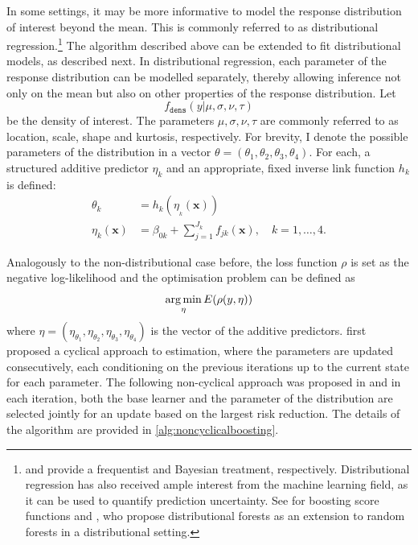 In some settings, it may be more informative to model the response distribution of interest beyond the mean. This is commonly referred to as distributional regression.\footnote{\textcite{rigbyGeneralizedAdditiveModels2005} and \textcite{kleinBayesianStructuredAdditive2015} provide a frequentist and Bayesian treatment, respectively. Distributional regression has also received ample interest from the machine learning field, as it can be used to quantify prediction uncertainty. See \textcite{duanNGBoostNaturalGradient2020} for boosting score functions and \textcite{schlosserDistributionalRegressionForests2019}, who propose distributional forests as an extension to random forests in a distributional setting.} The algorithm described above can be extended to fit distributional models, as described next. In distributional regression, each parameter of the response distribution can be modelled separately, thereby allowing inference not only on the mean but also on other properties of the response distribution. Let 
\begin{equation*}
	f_{\mathtt{dens}}(y \vert \mu, \sigma, \nu, \tau)
\end{equation*}
be the density of interest. The parameters $\mu, \sigma, \nu, \tau$ are commonly referred to as location, scale, shape and kurtosis, respectively. For brevity, I denote the possible parameters of the distribution in a vector $\theta = (\theta_1, \theta_2, \theta_3, \theta_4)$. For each, a structured additive predictor $\eta_k$ and an appropriate, fixed inverse link function $h_k$ is defined: 
\begin{align*}
	\theta_k &= h_k(\eta_{_k} (\mathbf{x}) ) \\
	\eta_k (\mathbf{x}) & =  \beta_{0k} + \sum_{j = 1}^{J_k} f_{jk} (\mathbf{x}), \quad k = 1, \dots, 4.
\end{align*} 

Analogously to the non-distributional case before, the loss function $\rho$ is set as the negative log-likelihood and the optimisation problem can be defined as 
\begin{equation*}
	\operatorname*{arg\,min}_{\eta} E(\rho(y, \eta))
\end{equation*}
where $\eta = (\eta_{\theta_1}, \eta_{\theta_2}, \eta_{\theta_3}, \eta_{\theta_4})$ is the vector of the additive predictors. \textcite{mayrGeneralizedAdditiveModels2012} first proposed a cyclical approach to estimation, where the parameters are updated consecutively, each conditioning on the previous iterations up to the current state for each parameter. The following non-cyclical approach was proposed in \textcite{thomasGradientBoostingDistributional2018} and in each iteration, both the base learner and the parameter of the distribution are selected jointly for an update based on the largest risk reduction. The details of the algorithm are provided in \autoref{alg:noncyclicalboosting}.

